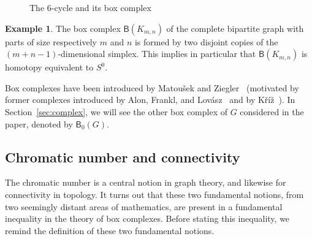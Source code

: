 \documentclass[12pt]{amsart}
\theoremstyle{definition}
\newtheorem{example}{Example}
\def\B{\mathsf{B}}
\newcounter{foo}
\begin{document}
\begin{figure}
{}

\caption{ \label{fig:BC6} The $6$-cycle and its box complex}
\end{figure}


\begin{example}\label{ex:box-bipcomplete}
    The box complex $\B(K_{m,n})$ of the complete bipartite graph with parts of size respectively $m$ and $n$ is formed by two disjoint copies of the $(m+n-1)$-dimensional simplex. This implies in particular that $\B(K_{m,n})$ is homotopy equivalent to $S^0$.
\end{example}

Box complexes have been introduced by Matou\v sek and Ziegler~\cite{matousek2002topological} (motivated by former complexes introduced by Alon, Frankl, and Lov\'asz~\cite{alon1986chromatic} and by K\v r\'i\v z~\cite{kriz1992equivariant}). In Section~\ref{sec:complex}, we will see the other box complex of $G$ considered in the paper, denoted by $\B_0(G)$.


\subsection{Chromatic number and connectivity} The chromatic number is a central notion in graph theory, and likewise for connectivity in topology. It turns out that these two fundamental notions, from two seemingly distant areas of mathematics, are present in a fundamental inequality in the theory of box complexes. Before stating this inequality, we remind the definition of these two fundamental notions.
\end{document}
